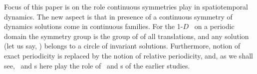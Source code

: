 Focus of this paper is on the role continuous symmetries
play in spatiotemporal dynamics. The new aspect is that
in presence of a continuous symmetry of dynamics solutions come
in continuous families. For the 1-$D$ \KS\ on a periodic domain
the symmetry group is the group of of all translations, and
any solution (let us say, \eqv) belongs to a circle of invariant
solutions. Furthermore, notion of exact periodicity is 
replaced by the notion of relative periodicity, and,
as we shall see, 
\reqva\ and \rpo s here play the role of \eqva\ and
\po s of the earlier studies.


